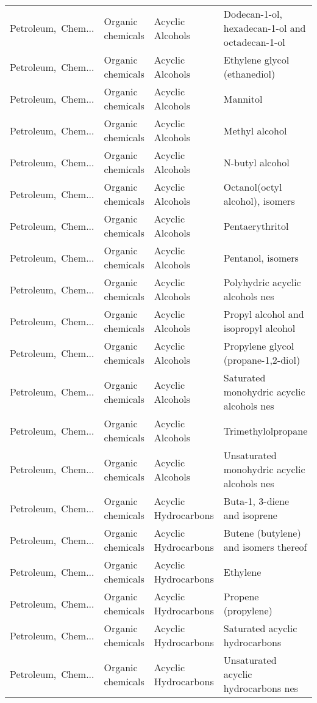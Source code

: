 \begin{appendices}
\begin{xltabular}{\textwidth}{|p{0.10\textwidth}|p{0.25\textwidth}|p{0.24\textwidth}|p{0.31\textwidth}|}
Petroleum,\ Chem... & Organic chemicals & Acyclic Alcohols & Dodecan-1-ol, hexadecan-1-ol and octadecan-1-ol \\
Petroleum,\ Chem... & Organic chemicals & Acyclic Alcohols & Ethylene glycol (ethanediol) \\
Petroleum,\ Chem... & Organic chemicals & Acyclic Alcohols & Mannitol \\
Petroleum,\ Chem... & Organic chemicals & Acyclic Alcohols & Methyl alcohol \\
Petroleum,\ Chem... & Organic chemicals & Acyclic Alcohols & N-butyl alcohol \\
Petroleum,\ Chem... & Organic chemicals & Acyclic Alcohols & Octanol(octyl alcohol), isomers \\
Petroleum,\ Chem... & Organic chemicals & Acyclic Alcohols & Pentaerythritol \\
Petroleum,\ Chem... & Organic chemicals & Acyclic Alcohols & Pentanol, isomers \\
Petroleum,\ Chem... & Organic chemicals & Acyclic Alcohols & Polyhydric acyclic alcohols nes \\
Petroleum,\ Chem... & Organic chemicals & Acyclic Alcohols & Propyl alcohol and isopropyl alcohol \\
Petroleum,\ Chem... & Organic chemicals & Acyclic Alcohols & Propylene glycol (propane-1,2-diol) \\
Petroleum,\ Chem... & Organic chemicals & Acyclic Alcohols & Saturated monohydric acyclic alcohols nes \\
Petroleum,\ Chem... & Organic chemicals & Acyclic Alcohols & Trimethylolpropane \\
Petroleum,\ Chem... & Organic chemicals & Acyclic Alcohols & Unsaturated monohydric acyclic alcohols nes \\
Petroleum,\ Chem... & Organic chemicals & Acyclic Hydrocarbons & Buta-1, 3-diene and isoprene \\
Petroleum,\ Chem... & Organic chemicals & Acyclic Hydrocarbons & Butene (butylene) and isomers thereof \\
Petroleum,\ Chem... & Organic chemicals & Acyclic Hydrocarbons & Ethylene \\
Petroleum,\ Chem... & Organic chemicals & Acyclic Hydrocarbons & Propene (propylene) \\
Petroleum,\ Chem... & Organic chemicals & Acyclic Hydrocarbons & Saturated acyclic hydrocarbons \\
Petroleum,\ Chem... & Organic chemicals & Acyclic Hydrocarbons & Unsaturated acyclic hydrocarbons nes \\

\end{xltabular}
\end{appendices}
